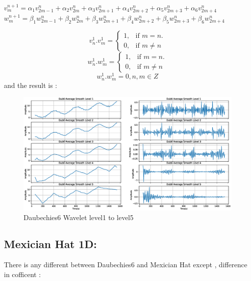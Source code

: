\documentclass[12pt]{article}
\begin{document}
\begin{center}
$v^{n+1}_m = \alpha_1 v^n_{2m-1} + \alpha_2 v^n_{2m} + \alpha_3 v^n_{2m+1} + \alpha_4 v^n_{2m+2} + \alpha_5 v^n_{2m+3} + \alpha_6 v^n_{2m+4}$\\
$w^{n+1}_m = \beta_1 w^n_{2m-1} + \beta_2 w^n_{2m} + \beta_3 w^n_{2m+1} + \beta_4 w^n_{2m+2} + \beta_5 w^n_{2m+3} + \beta_6 w^n_{2m+4}$
\end{center}
\begin{equation}
  v^1_n . v^1_m=\begin{cases}
    1, & \text{if $m = n$}.\\
    
    0, & \text{if $m \neq n $}
  \end{cases}
\end{equation}
\begin{equation}
  w^1_n . w^1_m=\begin{cases}
    1, & \text{if $m = n$}.\\
    
    0, & \text{if $m \neq n $}
  \end{cases}
\end{equation}
\begin{equation}
  w^1_n . w^1_m = 0 , n,m \in Z
\end{equation}
\newpage
and the result is :\\
\begin{figure}[h]
    \centering
    \includegraphics[width=1.1\textwidth]{img/Dub6.eps}
    \caption{Daubechies6 Wavelet level1 to level5}
    \label{fig:mesh1}
\end{figure}
\newpage
\subsection{Mexician Hat 1D:}
There is any different between Daubechies6 and Mexician Hat except , difference in cofficent  : \\
\end{document}

